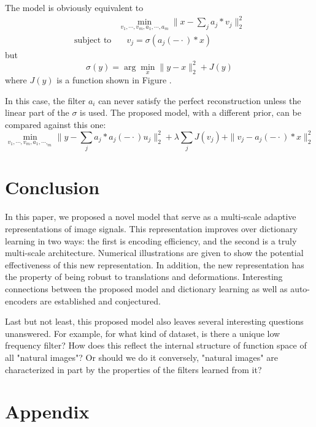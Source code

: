 \documentclass[a4paper]{article}
\begin{document}
{The model is obviously equivalent to 
\begin{equation}
	\begin{aligned}
		&\min_{v_1,\cdots,v_m,a_1,\cdots,a_m} \|x-\sum_j a_j*v_j\|_2^2  \\
		\textrm{subject to} & \quad v_j =\sigma(a_j(-\cdot)*x)
	\end{aligned}
\end{equation}
but 
\[
	\sigma(y)=\arg\min_x \|y-x\|_2^2 + J(y)
\]
where $J(y)$ is a function shown in Figure .

In this case, the filter $a_i$ can never satisfy the perfect reconstruction unless the linear part of the $\sigma$ is used. The proposed model, with a different prior, can be compared against this one:
\begin{equation}
	\min_{v_1,\cdots,v_m,a_1,\cdots,_m} \|y-\sum_j a_j*a_j(-\cdot)u_j\|_2^2 + \lambda \sum_j J(v_j)+\|v_j-a_j(-\cdot)*x\|_2^2
\end{equation}
}








\newpage
\section{Conclusion}
In this paper, we proposed a novel model that serve as a multi-scale adaptive representations of image signals. This representation improves over dictionary learning in two ways: the first is encoding efficiency, and the second is a truly multi-scale architecture. Numerical illustrations are given to show the potential effectiveness of this new representation. In addition, the new representation has the property of being robust to translations and deformations. Interesting connections between the proposed model and dictionary learning as well as auto-encoders are established and conjectured. 

Last but not least, this proposed model also leaves several interesting questions unanswered. For example, for what kind of dataset, is there a unique low frequency filter? How does this reflect the internal structure of function space of all "natural images"? Or should we do it conversely, "natural images" are characterized in part by the properties of the filters learned from it?

\section{Appendix}
\end{document}
